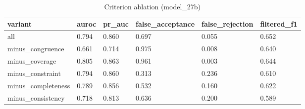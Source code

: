 \begin{table}[t]
\centering
\small
\begin{tabular}{llllll}
\hline
variant & auroc & pr\_auc & false\_acceptance & false\_rejection & filtered\_f1 \\
\hline
all & 0.794 & 0.860 & 0.697 & 0.055 & 0.652 \\
minus\_congruence & 0.661 & 0.714 & 0.975 & 0.008 & 0.640 \\
minus\_coverage & 0.805 & 0.863 & 0.961 & 0.003 & 0.644 \\
minus\_constraint & 0.794 & 0.860 & 0.313 & 0.236 & 0.610 \\
minus\_completeness & 0.789 & 0.856 & 0.532 & 0.160 & 0.622 \\
minus\_consistency & 0.718 & 0.813 & 0.636 & 0.200 & 0.589 \\
\hline
\end{tabular}
\caption{Criterion ablation (model\_27b)}
\label{tab:ablation_model_27b}
\end{table}
